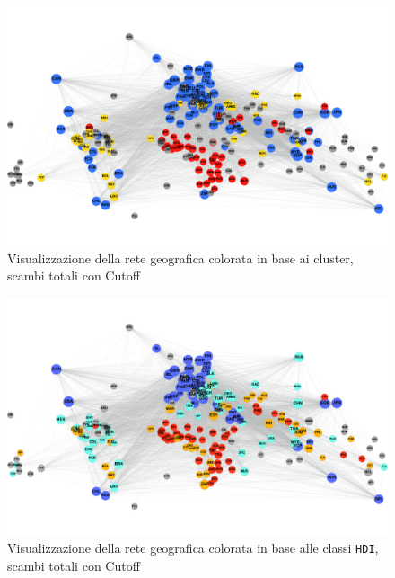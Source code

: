 \documentclass[]{article}
\begin{document}
	\begin{landscape}
		\begin{center}
			\begin{figure}[th!]
				\centering
				\includegraphics[scale=.35]{img/world-cluster.png}
				\caption{Visualizzazione della rete geografica colorata in base ai cluster, scambi totali con Cutoff}
				\label{fig:world-cluster}
			\end{figure}
		\end{center}
	
		\newpage
		\begin{center}
			\begin{figure}[th!]
				\centering
				\includegraphics[scale=.35]{img/world-hdi.png}
				\caption{Visualizzazione della rete geografica colorata in base alle classi \texttt{HDI}, scambi totali con Cutoff}
				\label{fig:world-hdi}
			\end{figure}
		\end{center}
		\end{landscape}
\end{document}
